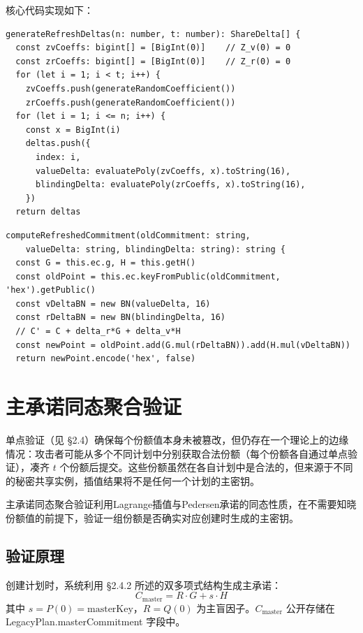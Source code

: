 \documentclass[UTF8,a4paper,zihao=-4,openany]{ctexrep}
\begin{document}
\noindent 核心代码实现如下：

\begin{lstlisting}[caption={零和多项式同态刷新增量生成 (shamir.ts)}]
generateRefreshDeltas(n: number, t: number): ShareDelta[] {
  const zvCoeffs: bigint[] = [BigInt(0)]    // Z_v(0) = 0
  const zrCoeffs: bigint[] = [BigInt(0)]    // Z_r(0) = 0
  for (let i = 1; i < t; i++) {
    zvCoeffs.push(generateRandomCoefficient())
    zrCoeffs.push(generateRandomCoefficient())
  for (let i = 1; i <= n; i++) {
    const x = BigInt(i)
    deltas.push({
      index: i,
      valueDelta: evaluatePoly(zvCoeffs, x).toString(16),
      blindingDelta: evaluatePoly(zrCoeffs, x).toString(16),
    })
  return deltas
\end{lstlisting}

\begin{lstlisting}[caption={承诺同态刷新计算 (shamir.ts)}]
computeRefreshedCommitment(oldCommitment: string,
    valueDelta: string, blindingDelta: string): string {
  const G = this.ec.g, H = this.getH()
  const oldPoint = this.ec.keyFromPublic(oldCommitment, 'hex').getPublic()
  const vDeltaBN = new BN(valueDelta, 16)
  const rDeltaBN = new BN(blindingDelta, 16)
  // C' = C + delta_r*G + delta_v*H
  const newPoint = oldPoint.add(G.mul(rDeltaBN)).add(H.mul(vDeltaBN))
  return newPoint.encode('hex', false)
\end{lstlisting}

\section{主承诺同态聚合验证}

单点验证（见 §2.4）确保每个份额值本身未被篡改，但仍存在一个理论上的边缘情况：攻击者可能从多个不同计划中分别获取合法份额（每个份额各自通过单点验证），凑齐 $t$ 个份额后提交。这些份额虽然在各自计划中是合法的，但来源于不同的秘密共享实例，插值结果将不是任何一个计划的主密钥。

主承诺同态聚合验证利用Lagrange插值与Pedersen承诺的同态性质，在不需要知晓份额值的前提下，验证一组份额是否确实对应创建时生成的主密钥。

\subsection{验证原理}

创建计划时，系统利用 §2.4.2 所述的双多项式结构生成主承诺：
\[
C_{\text{master}} = R \cdot G + s \cdot H
\]
其中 $s = P(0) = \text{masterKey}$，$R = Q(0)$ 为主盲因子。$C_{\text{master}}$ 公开存储在 LegacyPlan.masterCommitment 字段中。
\end{document}
